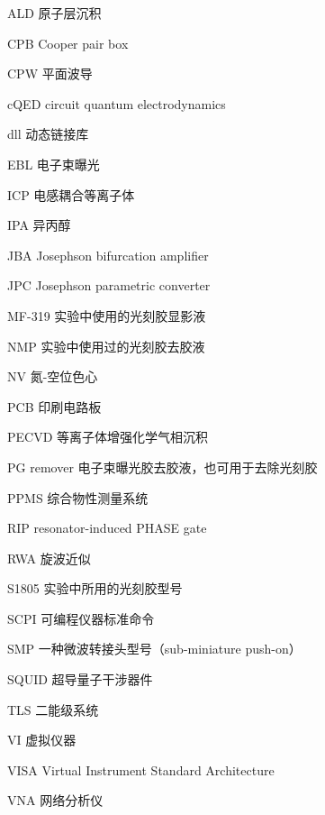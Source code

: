 

\begin{denotation}[3cm]
\item[ALD] 原子层沉积
\item[CPB] Cooper pair box
\item[CPW] 平面波导
\item[cQED] circuit quantum electrodynamics
\item[dll] 动态链接库
\item[EBL] 电子束曝光
\item[ICP] 电感耦合等离子体
\item[IPA] 异丙醇
\item[JBA] Josephson bifurcation amplifier
\item[JPC] Josephson parametric converter
\item[MF-319] 实验中使用的光刻胶显影液
\item[NMP] 实验中使用过的光刻胶去胶液
\item[NV] 氮-空位色心
\item[PCB] 印刷电路板
\item[PECVD] 等离子体增强化学气相沉积
\item[PG remover] 电子束曝光胶去胶液，也可用于去除光刻胶
\item[PPMS] 综合物性测量系统
\item[RIP] resonator-induced PHASE gate
\item[RWA] 旋波近似
\item[S1805] 实验中所用的光刻胶型号
\item[SCPI] 可编程仪器标准命令
\item[SMP] 一种微波转接头型号（sub-miniature push-on）
\item[SQUID] 超导量子干涉器件
\item[TLS] 二能级系统
\item[VI] 虚拟仪器
\item[VISA] Virtual Instrument Standard Architecture
\item[VNA] 网络分析仪
\end{denotation}
